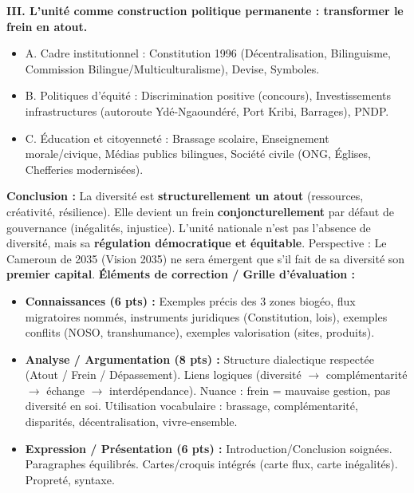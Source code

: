 \documentclass[11pt]{article}
\begin{document}
\begin{exoresolu}
\textbf{III. L'unité comme construction politique permanente : transformer le frein en atout.}
\begin{itemize}
    \item A. Cadre institutionnel : Constitution 1996 (Décentralisation, Bilinguisme, Commission Bilingue/Multiculturalisme), Devise, Symboles.
    \item B. Politiques d'équité : Discrimination positive (concours), Investissements infrastructures (autoroute Ydé-Ngaoundéré, Port Kribi, Barrages), PNDP.
    \item C. Éducation et citoyenneté : Brassage scolaire, Enseignement morale/civique, Médias publics bilingues, Société civile (ONG, Églises, Chefferies modernisées).
\end{itemize}
\par
\textbf{Conclusion :} La diversité est \textbf{structurellement un atout} (ressources, créativité, résilience). Elle devient un frein \textbf{conjoncturellement} par défaut de gouvernance (inégalités, injustice). L'unité nationale n'est pas l'absence de diversité, mais sa \textbf{régulation démocratique et équitable}. Perspective : Le Cameroun de 2035 (Vision 2035) ne sera émergent que s'il fait de sa diversité son \textbf{premier capital}.
\tcblower
\textbf{Éléments de correction / Grille d'évaluation :}
\begin{itemize}
    \item \textbf{Connaissances (6 pts) :} Exemples précis des 3 zones biogéo, flux migratoires nommés, instruments juridiques (Constitution, lois), exemples conflits (NOSO, transhumance), exemples valorisation (sites, produits).
    \item \textbf{Analyse / Argumentation (8 pts) :} Structure dialectique respectée (Atout / Frein / Dépassement). Liens logiques (diversité $\to$ complémentarité $\to$ échange $\to$ interdépendance). Nuance : \og frein \fg = mauvaise gestion, pas diversité en soi. Utilisation vocabulaire : brassage, complémentarité, disparités, décentralisation, vivre-ensemble.
    \item \textbf{Expression / Présentation (6 pts) :} Introduction/Conclusion soignées. Paragraphes équilibrés. Cartes/croquis intégrés (carte flux, carte inégalités). Propreté, syntaxe.
\end{itemize}
\end{exoresolu}
\end{document}
